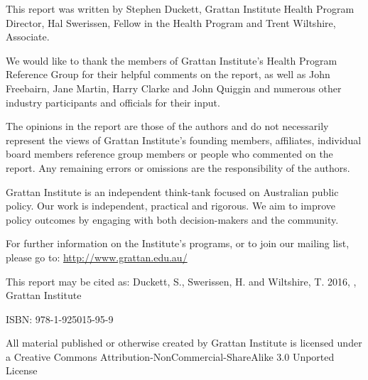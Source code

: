 This report was written by Stephen Duckett, Grattan Institute Health Program Director, Hal Swerissen, Fellow in the Health Program and Trent Wiltshire, Associate.

We would like to thank the members of Grattan Institute's Health Program Reference Group for their helpful comments on the report, as well as John Freebairn, Jane Martin, Harry Clarke and John Quiggin and numerous other industry participants and officials for their input.

The opinions in the report are those of the authors and do not necessarily represent the views of Grattan Institute’s founding members, affiliates, individual board members reference group members or people who commented on the report. Any remaining errors or omissions are the responsibility of the authors.

Grattan Institute is an independent think-tank focused on Australian public policy. Our work is independent, practical and rigorous. We aim to improve policy outcomes by engaging with both decision-makers and the community.

For further information on the Institute's programs, or to join our mailing list, please go to:
\textcolor{blue}{\url{http://www.grattan.edu.au/}}

{\footnotesize
This report may be cited as:
\newline
Duckett, S., Swerissen, H. and Wiltshire, T. 2016, \emph{\mytitle}, Grattan Institute

ISBN: 978-1-925015-95-9

All material published or otherwise created by Grattan Institute is licensed under a Creative Commons Attribution-NonCommercial-ShareAlike 3.0 Unported License\par 
}